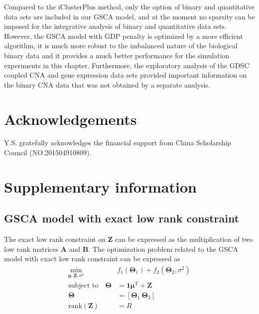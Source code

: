Compared to the iClusterPlus method, only the option of binary and quantitative data sets are included in our GSCA model, and at the moment no sparsity can be imposed for the integrative analysis of binary and quantitative data sets. However, the GSCA model with GDP penalty is optimized by a more efficient algorithm, it is much more robust to the imbalanced nature of the biological binary data and it provides a much better performance for the simulation experiments in this chapter. Furthermore, the exploratory analysis of the GDSC coupled CNA and gene expression data sets provided important information on the binary CNA data that was not obtained by a separate analysis.

\section*{Acknowledgements}
Y.S. gratefully acknowledges the financial support from China Scholarship Council (NO.201504910809).

\clearpage
\section{Supplementary information}
\subsection{GSCA model with exact low rank constraint}
The exact low rank constraint on $\mathbf{Z}$ can be expressed as the multiplication of two low rank matrices $\mathbf{A}$ and $\mathbf{B}$. The optimization problem related to the GSCA model with exact low rank constraint can be expressed as
\begin{equation*}
\begin{aligned}
    \min_{\bm{\mu},\mathbf{Z},\sigma^2} \quad & f_1(\mathbf{\Theta}_1) + f_2(\mathbf{\Theta}_2,\sigma^2) \\
    \text{subject to} \quad \mathbf{\Theta} &= \mathbf{1}\bm{\mu}^{\text{T}} + \mathbf{Z} \\
     \mathbf{\Theta} &= [\mathbf{\Theta}_1 ~ \mathbf{\Theta}_2] \\
    \text{rank}(\mathbf{Z}) &= R
\end{aligned}
\end{equation*}

